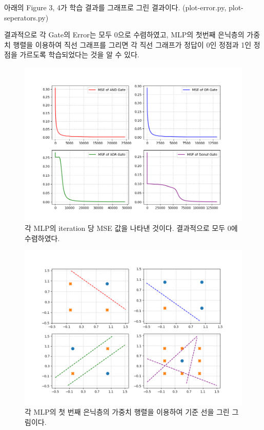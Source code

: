 \documentclass[letterpaper,10pt]{article}
\begin{document}
	아래의 Figure 3, 4가 학습 결과를 그래프로 그린 결과이다. (plot-error.py, plot-seperators.py)
	
	결과적으로 각 Gate의 Error는 모두 0으로 수렴하였고, MLP의 첫번째 은닉층의 가중치 행렬을 이용하여 직선 그래프를 그리면 각 직선 그래프가 정답이 0인 정점과 1인 정점을 가르도록 학습되었다는 것을 알 수 있다.
	
	\begin{figure}
		\centering
		\includegraphics[width=\linewidth]{images/graph-error.png}
		\caption{각 MLP의 iteration 당 MSE 값을 나타낸 것이다. 결과적으로 모두 0에 수렴하였다.}
	\end{figure}
	
	\begin{figure}
		\centering
		\includegraphics[width=\linewidth]{images/graph-lines.png}
		\caption{각 MLP의 첫 번째 은닉층의 가중치 행렬을 이용하여 기준 선을 그린 그림이다.}
	\end{figure}
	
\end{document}
